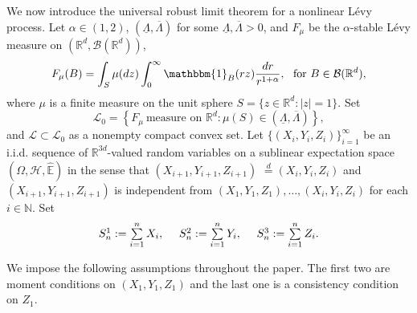 \documentclass[a4paper,oneside,10pt]{article}%
\numberwithin{equation}{section}
\begin{document}
We now introduce the universal robust limit theorem for a nonlinear L\'{e}vy
process. Let $\alpha \in(1,2)$, $(\underline{\Lambda},\overline{\Lambda})$ for
some $\underline{\Lambda},\overline{\Lambda}>0$, and $F_{\mu}$ be the $\alpha
$-stable L\'{e}vy measure on $(\mathbb{R}^{d},\mathcal{B}(\mathbb{R}^{d}))$,
\begin{equation}
F_{\mu}(B)=\int_{S}\mu(dz)\int_{0}^{\infty}\mathbbm{1}_{B}(rz)\frac
{dr}{r^{1+\alpha}},\text{ \ for }B\in \mathcal{B}(\mathbb{R}^{d}), \label{F_mu}%
\end{equation}
where $\mu$ is a finite measure on the unit sphere $S=\{z\in \mathbb{R}%
^{d}:|z|=1\}$. Set
\begin{equation}
\mathcal{L}_{0}=\left \{  F_{\mu}\  \text{measure on }\mathbb{R}^{d}:\mu
(S)\in(\underline{\Lambda},\overline{\Lambda})\right \}  , \label{L_0}%
\end{equation}
and $\mathcal{L\subset L}_{0}$ as a nonempty compact convex set.
Let $\{(X_{i},Y_{i},Z_{i})\}_{i=1}^{\infty}$ be an i.i.d. sequence of
$\mathbb{R}^{3d}$-valued random variables on a sublinear expectation space
$(\Omega,\mathcal{H},\mathbb{\hat{E}})$ in the sense that $(X_{i+1}%
,Y_{i+1},Z_{i+1})$ $\overset{d}{=}(X_{i},Y_{i},Z_{i})$ and $(X_{i+1}%
,Y_{i+1},Z_{i+1})$ is independent from $(X_{1},Y_{1},Z_{1}),\ldots
,(X_{i},Y_{i},Z_{i})$ for each $i\in \mathbb{N}$. Set
\[%
\begin{array}
[c]{rrr}%
S_{n}^{1}:=\sum \limits_{i=1}^{n}X_{i},\text{ } & S_{n}^{2}:=\sum
\limits_{i=1}^{n}Y_{i},\text{ } & S_{n}^{3}:=\sum \limits_{i=1}^{n}Z_{i}.
\end{array}
\]


We impose the following assumptions throughout the paper. The first two are
moment conditions on $(X_{1},Y_{1}, Z_{1})$ and the last one is a consistency
condition on $Z_{1}$.
\end{document}
